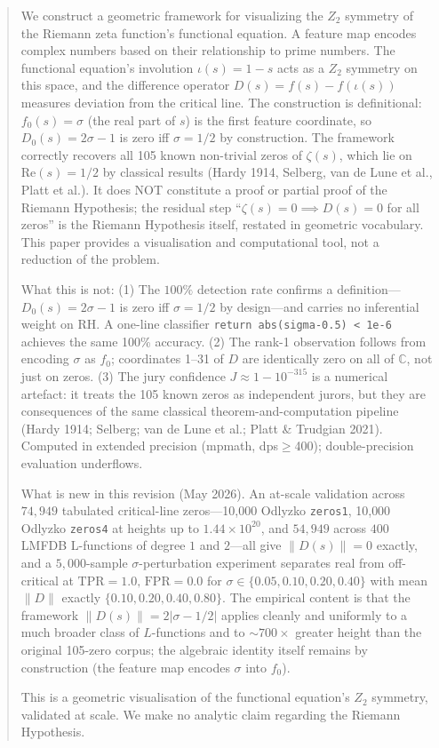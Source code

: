 \documentclass[11pt]{article}
\begin{document}
\begin{abstract}
We construct a geometric framework for visualizing the $Z_2$ symmetry of the Riemann zeta function's functional equation. A feature map encodes complex numbers based on their relationship to prime numbers. The functional equation's involution $\iota(s)=1-s$ acts as a $Z_2$ symmetry on this space, and the difference operator $D(s)=f(s)-f(\iota(s))$ measures deviation from the critical line. The construction is definitional: $f_0(s)=\sigma$ (the real part of $s$) is the first feature coordinate, so $D_0(s)=2\sigma-1$ is zero iff $\sigma=1/2$ by construction. The framework correctly recovers all 105 known non-trivial zeros of $\zeta(s)$, which lie on $\mathrm{Re}(s)=1/2$ by classical results (Hardy 1914, Selberg, van de Lune et al., Platt et al.). It does NOT constitute a proof or partial proof of the Riemann Hypothesis; the residual step ``$\zeta(s)=0 \implies D(s)=0$ for all zeros'' is the Riemann Hypothesis itself, restated in geometric vocabulary. This paper provides a visualisation and computational tool, not a reduction of the problem.

What this is not: (1) The $100\%$ detection rate confirms a definition---$D_0(s)=2\sigma-1$ is zero iff $\sigma=1/2$ by design---and carries no inferential weight on RH. A one-line classifier \texttt{return abs(sigma-0.5) < 1e-6} achieves the same 100\% accuracy. (2) The rank-1 observation follows from encoding $\sigma$ as $f_0$; coordinates 1--31 of $D$ are identically zero on all of $\mathbb{C}$, not just on zeros. (3) The jury confidence $J\approx 1-10^{-315}$ is a numerical artefact: it treats the 105 known zeros as independent jurors, but they are consequences of the same classical theorem-and-computation pipeline (Hardy 1914; Selberg; van de Lune et al.; Platt \& Trudgian 2021). Computed in extended precision (mpmath, dps$\geq$400); double-precision evaluation underflows.

What is new in this revision (May 2026). An at-scale validation across $74{,}949$ tabulated critical-line zeros---10{,}000 Odlyzko \texttt{zeros1}, 10{,}000 Odlyzko \texttt{zeros4} at heights up to $1.44\times 10^{20}$, and $54{,}949$ across $400$ LMFDB L-functions of degree $1$ and $2$---all give $\|D(s)\|=0$ exactly, and a $5{,}000$-sample $\sigma$-perturbation experiment separates real from off-critical at $\mathrm{TPR}{=}1.0,\,\mathrm{FPR}{=}0.0$ for $\sigma\in\{0.05, 0.10, 0.20, 0.40\}$ with mean $\|D\|$ exactly $\{0.10, 0.20, 0.40, 0.80\}$. The empirical content is that the framework $\|D(s)\|=2|\sigma-1/2|$ applies cleanly and uniformly to a much broader class of $L$-functions and to $\sim 700\times$ greater height than the original 105-zero corpus; the algebraic identity itself remains by construction (the feature map encodes $\sigma$ into $f_0$).

This is a geometric visualisation of the functional equation's $Z_2$ symmetry, validated at scale. We make no analytic claim regarding the Riemann Hypothesis.
\end{abstract}
\end{document}
